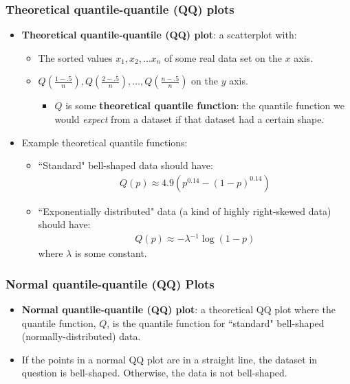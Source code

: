 \documentclass{beamer}\usepackage{graphicx, color}
\providecommand{\nv}{{}^{-1}}
\numberwithin{equation}{section}
\begin{document}
\begin{frame}
\frametitle{Theoretical quantile-quantile (QQ) plots}

\begin{itemize}
\item {\bf Theoretical quantile-quantile (QQ) plot}: a scatterplot with:
\begin{itemize}
\pause \item The sorted values $x_1, x_2, \ldots x_n$ of some real data set on the $x$ axis.
\pause \item $Q(\frac{1 - .5}{n}), Q(\frac{2 - .5}{n}), \ldots, Q(\frac{n - .5}{n})$ on the $y$ axis.
\begin{itemize}
\pause \item $Q$ is some {\bf theoretical quantile function}: the quantile function we would \emph{expect} from a dataset if that dataset had a certain shape.
\end{itemize}
\end{itemize}

\pause \item Example theoretical quantile functions:
\begin{itemize}
\pause \item ``Standard" bell-shaped data should have:
\begin{align*}
Q(p) \approx 4.9(p^{0.14} - (1 - p)^{0.14})
\end{align*}
\pause \item ``Exponentially distributed" data (a kind of highly right-skewed data) should have:
\begin{align*}
Q(p) \approx - \lambda \nv \log(1-p)
\end{align*}
where $\lambda$ is some constant.
\end{itemize}
\end{itemize}
\end{frame}

\begin{frame}
\frametitle{Normal quantile-quantile (QQ) Plots}
\begin{itemize}
\item {\bf Normal quantile-quantile (QQ) plot}: a theoretical QQ plot where the quantile function, $Q$, is the quantile function for ``standard" bell-shaped (normally-distributed) data.
\pause \item If the points in a normal QQ plot are in a straight line, the dataset in question is bell-shaped. Otherwise, the data is not bell-shaped.
\end{itemize}
\end{frame}
\end{document}
